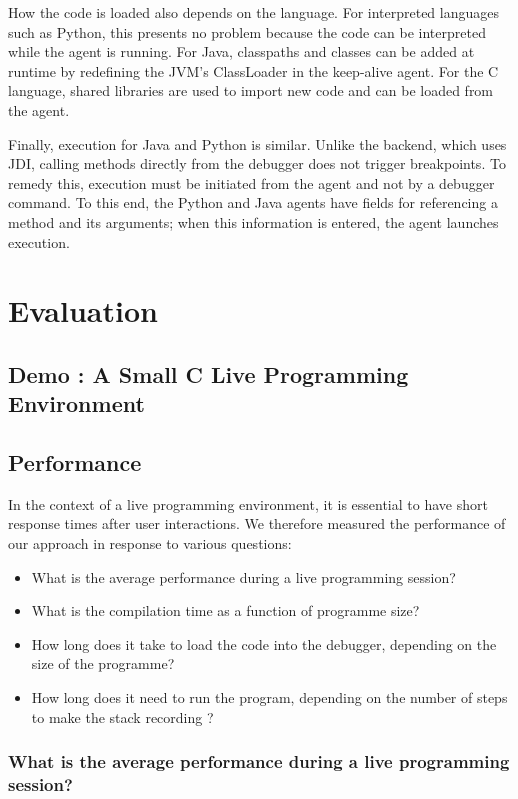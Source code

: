 \documentclass[english,submission]{programming}
\begin{document}
How the code is loaded also depends on the language. For interpreted languages such as Python, this presents no problem because the code can be interpreted while the agent is running. For Java, classpaths and classes can be added at runtime by redefining the JVM's ClassLoader in the keep-alive agent. For the C language, shared libraries are used to import new code and can be loaded from the agent.

Finally, execution for Java and Python is similar. Unlike the backend, which uses JDI, calling methods directly from the debugger does not trigger breakpoints. To remedy this, execution must be initiated from the agent and not by a debugger command. To this end, the Python and Java agents have fields for referencing a method and its arguments; when this information is entered, the agent launches execution.

\section{Evaluation}
\label{sec:evaluation}
\subsection{Demo : A Small C Live Programming Environment}
\label{sec:demo-small-c}
\subsection{Performance}
\label{sec:performance}

In the context of a live programming environment, it is essential to have short response times after user interactions. 
We therefore measured the performance of our approach in response to various questions:

\begin{itemize}
  \item What is the average performance during a live programming session?
  \item What is the compilation time as a function of programme size?
  \item How long does it take to load the code into the debugger, depending on the size of the programme?
  \item How long does it need to run the program, depending on the number of steps to make the stack recording ?
\end{itemize}

\subsubsection{What is the average performance during a live programming session?}
\end{document}
